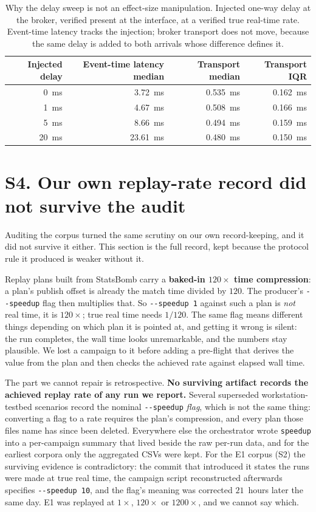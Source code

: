 \documentclass[10pt,journal,onecolumn]{IEEEtran}
\begin{document}
\begin{table}[t]
\caption[Why the delay sweep is not an effect-size manipulation]{Why the delay sweep is not an effect-size manipulation. Injected one-way delay at the
broker, verified present at the interface, at a verified true real-time rate. Event-time latency tracks the
injection; broker transport does not move, because the same delay is added to both arrivals whose
difference defines it.}
\label{tab:eb2}
\begin{tabular}{rrrr}
\toprule
Injected delay & Event-time latency median & Transport median & Transport IQR \\
\midrule
0~ms  &  3.72~ms & 0.535~ms & 0.162~ms \\
1~ms  &  4.67~ms & 0.508~ms & 0.166~ms \\
5~ms  &  8.66~ms & 0.494~ms & 0.159~ms \\
20~ms & 23.61~ms & 0.480~ms & 0.150~ms \\
\bottomrule
\end{tabular}
\end{table}

\section{S4. Our own replay-rate record did not survive the audit}

Auditing the corpus turned the same scrutiny on our own record-keeping, and it did not survive
it either. This section is the full record, kept
because the protocol rule it produced is weaker without it.

Replay plans built from StatsBomb carry a \textbf{baked-in $120\times$ time compression}: a
plan's publish offset is already the match time divided by $120$. The producer's
\texttt{-{}-speedup} flag then multiplies that. So \texttt{-{}-speedup 1} against such a plan is
\emph{not} real time, it is $120\times$; true real time needs $1/120$. The same flag means
different things depending on which plan it is pointed at, and getting it wrong is silent: the
run completes, the wall time looks unremarkable, and the numbers stay plausible. We lost a
campaign to it before adding a pre-flight that derives the value from the plan and then checks
the achieved rate against elapsed wall time.

The part we cannot repair is retrospective. \textbf{No surviving artifact records the achieved
replay rate of any run we report.} Several superseded workstation-testbed scenarios record the nominal
\texttt{-{}-speedup} \emph{flag}, which is not the same thing: converting a flag to a rate requires
the plan's compression, and every plan those files name has since been deleted. Everywhere else
the orchestrator
wrote \texttt{speedup} into a per-campaign summary that lived beside the raw per-run data, and
for the earliest corpora only the aggregated CSVs were kept. For the E1 corpus (S2) the surviving evidence is contradictory: the
commit that introduced it states the runs were made at true real time, the campaign script
reconstructed afterwards specifies \texttt{-{}-speedup 10}, and the flag's meaning was corrected
$21$~hours later the same day. E1 was replayed at $1\times$, $120\times$ or $1200\times$, and we
cannot say which.
\end{document}
